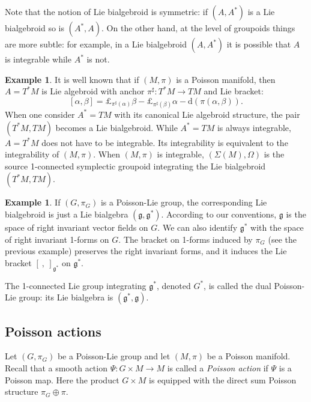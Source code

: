 \documentclass[a4paper,11pt]{amsart}
\theoremstyle{definition}
\newtheorem{ex}[thm]{Example}
\theoremstyle{remark}
\begin{document}
Note that the notion of Lie bialgebroid is symmetric: if $(A,A^*)$
is a Lie bialgebroid so is $(A^*,A)$. On the other hand, at the
level of groupoids things are more subtle: for example, in a Lie
bialgebroid $(A,A^*)$ it is possible that $A$ is integrable while
$A^*$ is not.

\begin{ex}
It is well known that if $(M,\pi)$ is a Poisson manifold, then $A=T^*M$ is Lie algebroid with
anchor $\pi^\sharp:T^*M\to TM$ and Lie bracket:
\[ [{\alpha},{\beta}]={\boldsymbol{\pounds}}_{\pi^\sharp({\alpha})}{\beta}-{\boldsymbol{\pounds}}_{\pi^\sharp({\beta})}{\alpha}-{\mathrm d}(\pi({\alpha},{\beta})).\]
When one consider $A^*=TM$ with its canonical Lie algebroid structure, the pair $(T^*M,TM)$ becomes
a Lie bialgebroid. While $A^*=TM$ is always integrable, $A=T^*M$ does not have to be integrable. Its
integrability is equivalent to the integrability of $(M,\pi)$. When $(M,\pi)$ is integrable, $(\Sigma(M),\Omega)$
is the source 1-connected symplectic groupoid integrating the Lie bialgebroid $(T^*M,TM)$.
\end{ex}

\begin{ex}
If $(G,\pi_G)$ is a Poisson-Lie group, the corresponding Lie
bialgebroid is just a Lie bialgebra $({\mathfrak{g}},{\mathfrak{g}}^*)$. According to
our conventions, ${\mathfrak{g}}$ is the space of right invariant vector
fields on $G$. We can also identify ${\mathfrak{g}}^*$ with the space of
right invariant 1-forms on $G$. The bracket on 1-forms induced by
$\pi_G$ (see the previous example) preserves the right invariant
forms, and it induces the Lie bracket $[~,~]_{{\mathfrak{g}}^*}$ on ${\mathfrak{g}}^*$.

The 1-connected Lie group integrating ${\mathfrak{g}}^*$, denoted $G^*$, is called the dual Poisson-Lie group: its Lie
bialgebra is $({\mathfrak{g}}^*,{\mathfrak{g}})$.
\end{ex}
\subsection{Poisson actions}                                   \label{subsec:poisson:actions}                                 
Let $(G,\pi_G)$ be a Poisson-Lie group and let $(M,\pi)$ be a Poisson manifold. Recall that a smooth action
$\Psi:G\times M\to M$ is called a \emph{Poisson action} if $\Psi$ is a Poisson map. Here the product $G\times M$
is equipped with the direct sum Poisson structure $\pi_G\oplus\pi$.
\end{document}
